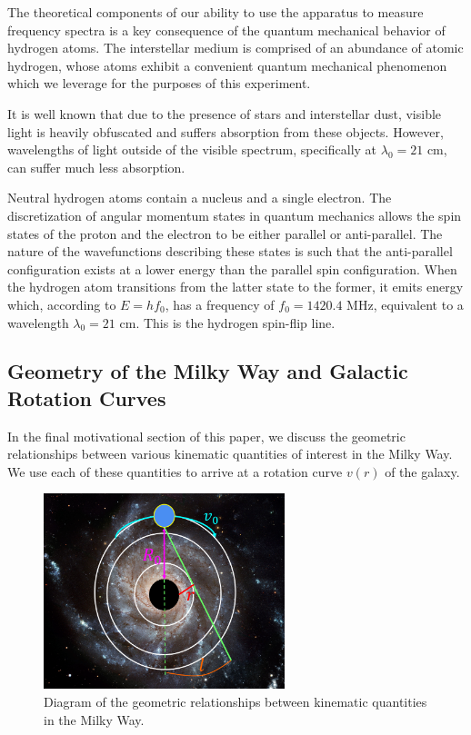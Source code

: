 \documentclass[aps,twocolumn,secnumarabic,balancelastpage,amsmath,amssymb,nofootinbib, floatfix]{revtex4-2}
\begin{document}
	The theoretical components of our ability to use the apparatus to measure frequency spectra is a key consequence of the quantum mechanical behavior of hydrogen atoms. The interstellar medium is comprised of an abundance of atomic hydrogen, whose atoms exhibit a convenient quantum mechanical phenomenon which we leverage for the purposes of this experiment. 
	
	It is well known that due to the presence of stars and interstellar dust, visible light is heavily obfuscated and suffers absorption from these objects. However, wavelengths of light outside of the visible spectrum, specifically at $\lambda_{0}=21$ cm, can suffer much less absorption. 
	
	Neutral hydrogen atoms contain a nucleus and a single electron. The discretization of angular momentum states in quantum mechanics allows the spin states of the proton and the electron to be either parallel or anti-parallel. The nature of the wavefunctions describing these states is such that the anti-parallel configuration exists at a lower energy than the parallel spin configuration. When the hydrogen atom transitions from the latter state to the former, it emits energy which, according to $E=hf_{0}$, has a frequency of $f_{0}=1420.4$ MHz, equivalent to a wavelength $\lambda_{0}=21$ cm. This is the hydrogen spin-flip line.
	
	\subsection{Geometry of the Milky Way and Galactic Rotation Curves}
	In the final motivational section of this paper, we discuss the geometric relationships between various kinematic quantities of interest in the Milky Way. We use each of these quantities to arrive at a rotation curve $v(r)$ of the galaxy.
	
	\begin{figure}
		\includegraphics[width=7cm]{galactic_geometry.png}
		\caption{Diagram of the geometric relationships between kinematic quantities in the Milky Way.}
		\label{fig:geometry}
	\end{figure}
	
\end{document}
